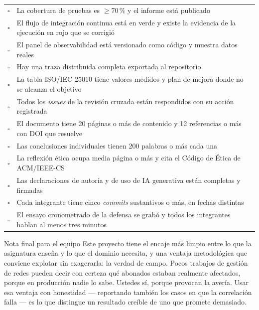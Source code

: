 \documentclass[11pt,a4paper]{article}
\begin{document}
\begin{center}
\begin{longtable}{@{}p{0.7cm}p{14.2cm}@{}}
			$\square$ & La cobertura de pruebas es $\geq 70\,\%$ y el informe está publicado \\
			$\square$ & El flujo de integración continua está en verde y existe la evidencia de la ejecución en rojo que se corrigió \\
			$\square$ & El panel de observabilidad está versionado como código y muestra datos reales \\
			$\square$ & Hay una traza distribuida completa exportada al repositorio \\
			$\square$ & La tabla ISO/IEC 25010 tiene valores medidos y plan de mejora donde no se alcanza el objetivo \\
			$\square$ & Todos los \emph{issues} de la revisión cruzada están respondidos con su acción registrada \\
			$\square$ & El documento tiene 20 páginas o más de contenido y 12 referencias o más con DOI que resuelve \\
			$\square$ & Las conclusiones individuales tienen 200 palabras o más cada una \\
			$\square$ & La reflexión ética ocupa media página o más y cita el Código de Ética de ACM/IEEE-CS \\
			$\square$ & Las declaraciones de autoría y de uso de IA generativa están completas y firmadas \\
			$\square$ & Cada integrante tiene cinco \emph{commits} sustantivos o más, en fechas distintas \\
			$\square$ & El ensayo cronometrado de la defensa se grabó y todos los integrantes hablan al menos tres minutos \\
			\bottomrule
		\end{longtable}
	\end{center}
	
	\vspace{6pt}
	\begin{uteqbox}{Nota final para el equipo}
		Este proyecto tiene el encaje más limpio entre lo que la asignatura enseña y lo que el dominio necesita, y una ventaja metodológica que conviene explotar sin exagerarla: la verdad de campo. Pocos trabajos de gestión de redes pueden decir con certeza qué abonados estaban realmente afectados, porque en producción nadie lo sabe. Ustedes sí, porque provocan la avería. Usar esa ventaja con honestidad --- reportando también los casos en que la correlación falla --- es lo que distingue un resultado creíble de uno que promete demasiado.
	\end{uteqbox}
	
\end{document}
